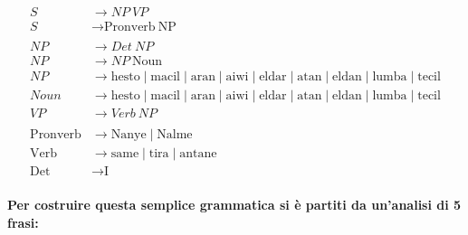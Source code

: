 \begin{tcolorbox}[title=Grammatica in CNF,colback=gray!5!white,colframe=gray!75!black]
\begin{align*}
S &\rightarrow NP\ VP \\
S &\rightarrow \text{Pronverb}\ \text{NP} \\
\\
NP &\rightarrow Det\ NP \\
NP &\rightarrow NP\ \text{Noun} \\
NP &\rightarrow \text{hesto} \mid \text{macil} \mid \text{aran} \mid \text{aiwi} \mid \text{eldar} \mid \text{atan} \mid \text{eldan} \mid \text{lumba} \mid \text{tecil} \\
Noun &\rightarrow \text{hesto} \mid \text{macil} \mid \text{aran} \mid \text{aiwi} \mid \text{eldar} \mid \text{atan} \mid \text{eldan} \mid \text{lumba} \mid \text{tecil} \\
VP &\rightarrow Verb\ NP \\
\\
\text{Pronverb} &\rightarrow \text{Nanye} \mid \text{Nalme} \\
\text{Verb} &\rightarrow \text{same} \mid \text{tira} \mid \text{antane} \\
\text{Det} &\rightarrow \text{I}
\end{align*}
\end{tcolorbox}


\paragraph{Per costruire questa semplice grammatica si è partiti da un'analisi di 5 frasi:}

